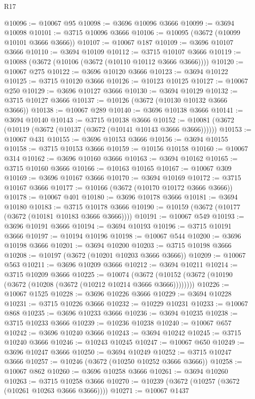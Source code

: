 \begin{lexlean}{R17}
\begin{coremodule}
@10096 := @10067 @95
@10098 := @3696 @10096 @3666
@10099 := @3694 @10098
@10101 := @3715 @10096 @3666
@10106 := @10095 (@3672 (@10099 @10101 @3666 @3666))
@10107 := @10067 @187
@10109 := @3696 @10107 @3666
@10110 := @3694 @10109
@10112 := @3715 @10107 @3666
@10119 := @10088 (@3672 (@10106 (@3672 (@10110 @10112 @3666 @3666))))
@10120 := @10067 @275
@10122 := @3696 @10120 @3666
@10123 := @3694 @10122
@10125 := @3715 @10120 @3666
@10126 := @10123 @10125
@10127 := @10067 @250
@10129 := @3696 @10127 @3666
@10130 := @3694 @10129
@10132 := @3715 @10127 @3666
@10137 := @10126 (@3672 (@10130 @10132 @3666 @3666))
@10138 := @10067 @289
@10140 := @3696 @10138 @3666
@10141 := @3694 @10140
@10143 := @3715 @10138 @3666
@10152 := @10081 (@3672 (@10119 (@3672 (@10137 (@3672 (@10141 @10143 @3666 @3666))))))
@10153 := @10067 @431
@10155 := @3696 @10153 @3666
@10156 := @3694 @10155
@10158 := @3715 @10153 @3666
@10159 := @10156 @10158
@10160 := @10067 @314
@10162 := @3696 @10160 @3666
@10163 := @3694 @10162
@10165 := @3715 @10160 @3666
@10166 := @10163 @10165
@10167 := @10067 @309
@10169 := @3696 @10167 @3666
@10170 := @3694 @10169
@10172 := @3715 @10167 @3666
@10177 := @10166 (@3672 (@10170 @10172 @3666 @3666))
@10178 := @10067 @401
@10180 := @3696 @10178 @3666
@10181 := @3694 @10180
@10183 := @3715 @10178 @3666
@10190 := @10159 (@3672 (@10177 (@3672 (@10181 @10183 @3666 @3666))))
@10191 := @10067 @549
@10193 := @3696 @10191 @3666
@10194 := @3694 @10193
@10196 := @3715 @10191 @3666
@10197 := @10194 @10196
@10198 := @10067 @544
@10200 := @3696 @10198 @3666
@10201 := @3694 @10200
@10203 := @3715 @10198 @3666
@10208 := @10197 (@3672 (@10201 @10203 @3666 @3666))
@10209 := @10067 @563
@10211 := @3696 @10209 @3666
@10212 := @3694 @10211
@10214 := @3715 @10209 @3666
@10225 := @10074
    (@3672 (@10152 (@3672 (@10190 (@3672 (@10208 (@3672 (@10212 @10214 @3666 @3666))))))))
@10226 := @10067 @1525
@10228 := @3696 @10226 @3666
@10229 := @3694 @10228
@10231 := @3715 @10226 @3666
@10232 := @10229 @10231
@10233 := @10067 @868
@10235 := @3696 @10233 @3666
@10236 := @3694 @10235
@10238 := @3715 @10233 @3666
@10239 := @10236 @10238
@10240 := @10067 @657
@10242 := @3696 @10240 @3666
@10243 := @3694 @10242
@10245 := @3715 @10240 @3666
@10246 := @10243 @10245
@10247 := @10067 @650
@10249 := @3696 @10247 @3666
@10250 := @3694 @10249
@10252 := @3715 @10247 @3666
@10257 := @10246 (@3672 (@10250 @10252 @3666 @3666))
@10258 := @10067 @862
@10260 := @3696 @10258 @3666
@10261 := @3694 @10260
@10263 := @3715 @10258 @3666
@10270 := @10239 (@3672 (@10257 (@3672 (@10261 @10263 @3666 @3666))))
@10271 := @10067 @1437

\end{coremodule}
\end{lexlean}
